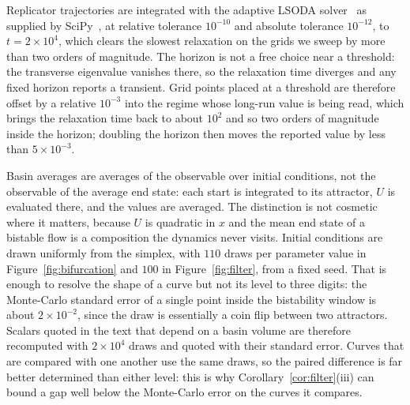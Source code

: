 \documentclass[11pt,a4paper]{article}
\theoremstyle{definition}
\begin{document}
Replicator trajectories are integrated with the adaptive LSODA
solver~\citep{petzold1983lsoda} as supplied by
SciPy~\citep{virtanen2020scipy}, at
relative tolerance $10^{-10}$ and absolute tolerance $10^{-12}$, to
$t=2\times10^{4}$, which clears the slowest relaxation on the grids we sweep by
more than two orders of magnitude. The horizon is not a free choice near a
threshold: the transverse eigenvalue vanishes there, so the relaxation time
diverges and any fixed horizon reports a transient. Grid points placed at a
threshold are therefore offset by a relative $10^{-3}$ into the regime whose
long-run value is being read, which brings the relaxation time back to about
$10^{2}$ and so two orders of magnitude inside the horizon; doubling the
horizon then moves the reported value by less than $5\times10^{-3}$.

Basin averages are averages of the observable over initial conditions, not the
observable of the average end state: each start is integrated to its
attractor, $U$ is evaluated there, and the values are averaged. The
distinction is not cosmetic where it matters, because $U$ is quadratic in $x$
and the mean end state of a bistable flow is a composition the dynamics never
visits. Initial conditions are drawn uniformly from the simplex, with $110$
draws per parameter value in Figure~\ref{fig:bifurcation} and $100$ in
Figure~\ref{fig:filter}, from a fixed seed. That is enough to resolve the
shape of a curve but not its level to three digits: the Monte-Carlo standard
error of a single point inside the bistability window is about $2\times
10^{-2}$, since the draw is essentially a coin flip between two attractors.
Scalars quoted in the text that depend on a basin volume are therefore
recomputed with $2\times10^{4}$ draws and quoted with their standard error.
Curves that are compared with one another use the same draws, so the paired
difference is far better determined than either level: this is why
Corollary~\ref{cor:filter}(iii) can bound a gap well below the
Monte-Carlo error on the curves it compares.
\end{document}
